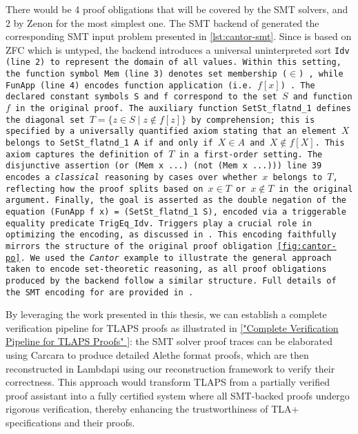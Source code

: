 \smallskip



\smallskip

There would be 4 proof obligations that will be covered by the SMT solvers, and 2 by Zenon for the most simplest one. 
The SMT backend of \tlaplus generated the corresponding SMT input problem presented in \cref{lst:cantor-smt}.
Since \tlaplus is based on ZFC which is untyped, the backend introduces a universal uninterpreted sort \tt{Idv} (line 2) to represent the domain of all values.
Within this setting,  the function symbol \tt{Mem} (line 3) denotes set membership ($\in$)  ,  while \tt{FunApp} (line 4) encodes function application (i.e. $f[x]$) .
The declared constant symbols \tt{S} and \tt{f} correspond to the set $S$ and function $f$ in the original proof.
The auxiliary function \tt{SetSt\_flatnd\_1} defines the diagonal set $T = \{ z \in S \mid z \notin f[z] \}$ by comprehension; this is specified by a universally quantified axiom stating that an element $X$ belongs to \tt{SetSt\_flatnd\_1 A} if and only if $X \in A$ and $X \notin f[X]$.
This axiom captures the definition of $T$ in a first-order setting.
The disjunctive assertion \tt{(or (Mem x ...) (not (Mem x ...)))} line 39 encodes a \emph{classical} reasoning by cases over whether $x$ belongs to $T$, reflecting how the proof splits based on $x \in T$ or $x \notin T$ in the original \tlaplus argument. 
Finally, the goal is asserted as the double negation of the equation \tt{(FunApp f x) = (SetSt\_flatnd\_1 S)}, encoded via a triggerable equality predicate \tt{TrigEq\_Idv}.
Triggers play a crucial role in optimizing the encoding, as discussed in \cite[\S3]{new-encoding-tlaps}.
%
This encoding faithfully mirrors the structure of the original \tlaplus proof obligation \cref{fig:cantor-po}.
We used the \textit{Cantor} example to illustrate the general approach taken to encode set-theoretic reasoning, as all proof obligations produced by the backend follow a similar structure.
Full details of the SMT encoding for \tlaplus are provided in \cite{new-encoding-tlaps}.

By leveraging the work presented in this thesis, we can establish a complete verification pipeline for TLAPS proofs as illustrated in \cref{"Complete Verification Pipeline for TLAPS Proofs"
}: the SMT solver proof traces can be elaborated using Carcara to produce detailed Alethe format proofs, which are then reconstructed in Lambdapi using our reconstruction framework to verify their correctness.
This approach would transform TLAPS from a partially verified proof assistant into a fully certified system where all SMT-backed proofs undergo rigorous verification, thereby enhancing the trustworthiness of TLA+ specifications and their proofs.

